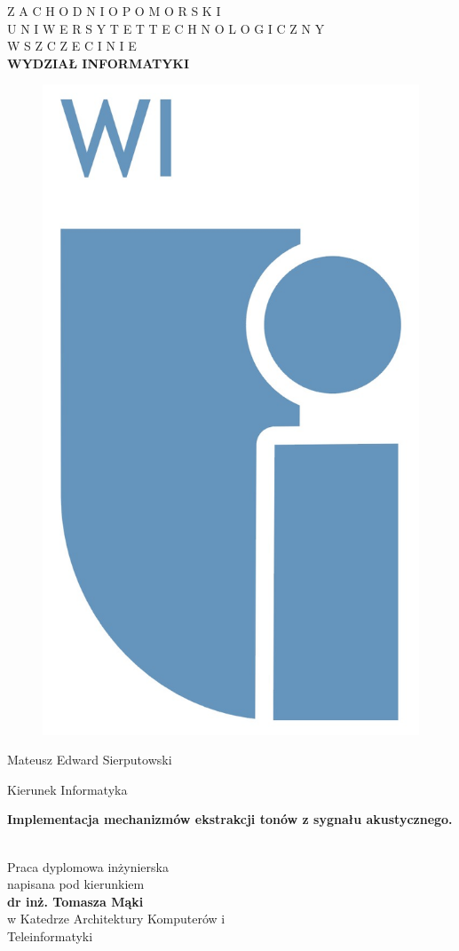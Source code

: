 


\begin{titlepage}

 \begin{center}

  \vfill                          %
    { 
        Z A C H O D N I O P O M O R S K I\\ U N I W E R S Y T E T
        \hspace{0.3 cm}
        T E C H N O L O G I C Z N Y\\ W
        \hspace{0.3 cm}
        S Z C Z E C I N I E\\
        \vspace{0.7 cm}	
        {  \textbf{WYDZIAŁ INFORMATYKI} }
    } \\
    \vspace{1.cm}
    \begin{figure}[h!]
    \centerline{\includegraphics[width=0.2\linewidth, natwidth=279,natheight=480]{rys/wizut_logo.png}} %
	\end{figure}

    \vspace{1.cm}
      { \Large {Mateusz Edward Sierputowski} \\ } 
      
    \vspace{0.2 cm}
      {Kierunek Informatyka} \\

  \vspace{1.cm}                   %
  
     { \huge \textbf{Implementacja mechanizmów ekstrakcji tonów z sygnału akustycznego.} \\
       \huge \textbf{} \\
     } 

\end{center}

\begin{flushleft}
  \vspace{1.0 cm}
  {
        \hspace{8.0 cm}    Praca dyplomowa inżynierska \\
        \hspace{8.0 cm}    napisana pod kierunkiem \\
        \hspace{8.0 cm}    \textbf{dr inż. Tomasza Mąki} \\
        \hspace{8.0 cm}    w Katedrze Architektury Komputerów i \\
        \hspace{8.0 cm}		Teleinformatyki \\
  }


\end{flushleft}
\end{titlepage}
